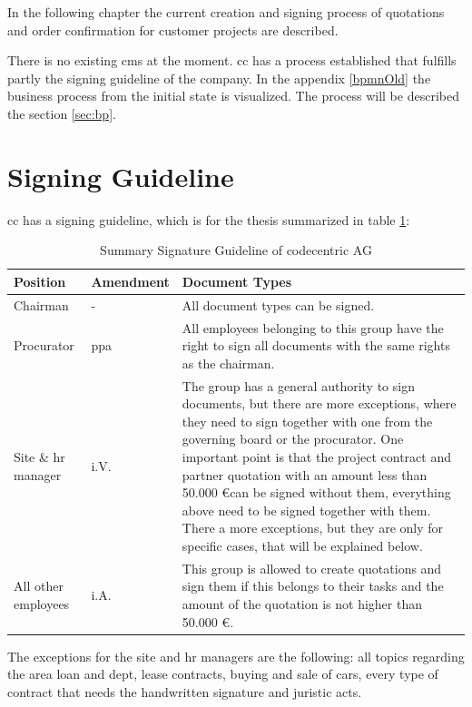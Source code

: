 In the following chapter the current creation and signing process of quotations and order confirmation for customer projects are described.

There is no existing \gls{cms} at the moment. \Gls{cc} has a process established that fulfills partly the signing guideline of the company. In the appendix \ref{bpmnOld} the business process from the initial state is visualized. The process will be described the section \ref{sec:bp}.

\section{Signing Guideline} \label{sec:signingGuideline}

\Gls{cc} has a signing guideline, which is for the thesis summarized in table \ref{tab:summarySignatureGuideline}:
\begin{table}[h!]
	\begin{tabular}{|p{3cm}|p{2cm}|p{10cm}|}\hline
		\rowcolor{Gray}Position & Amendment & Document Types \\ \hline
		Chairman & - & All document types can be signed. \\ \hline
		Procurator & ppa & All employees belonging to this group have the right to sign all documents with the same rights as the chairman.\\ \hline
		Site \& \gls{hr} manager & i.V. & The group has a general authority to sign documents, but there are more exceptions, where they need to sign together with one from the governing board or the procurator. One important point is that the project contract and partner quotation with an amount less than 50.000 \euro can be signed without them, everything above need to be signed together with them. There a more exceptions, but they are only for specific cases, that will be explained below. \\ \hline
		All other employees & i.A. & This group is allowed to create quotations and sign them if this belongs to their tasks and the amount of the quotation is not higher than 50.000 \euro. \\ \hline
	\end{tabular}
	\caption{Summary Signature Guideline of codecentric AG}
	\label{tab:summarySignatureGuideline}
\end{table}

The exceptions for the site and \gls{hr} managers are the following: all topics regarding the area loan and dept, lease contracts, buying and sale of cars, every type of contract that needs the handwritten signature and juristic acts.

